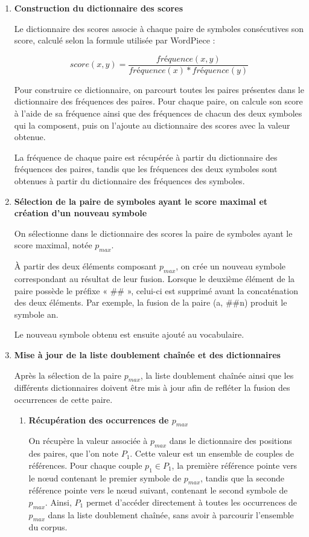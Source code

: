 \documentclass[12pt,a4paper]{report}
\begin{document}
\begin{enumerate}
		\item \textbf{Construction du dictionnaire des scores}
		
		Le dictionnaire des scores associe à chaque paire de symboles consécutives son score, calculé selon la formule utilisée par WordPiece :
		
		\[
		score(x,y)=\frac{fréquence(x,y)}{fréquence(x) * fréquence(y)}
		\]
		
		Pour construire ce dictionnaire, on parcourt toutes les paires présentes dans le dictionnaire des fréquences des paires. Pour chaque paire, on calcule son score à l'aide de sa fréquence ainsi que des fréquences de chacun des deux symboles qui la composent, puis on l'ajoute au dictionnaire des scores avec la valeur obtenue.
		
		La fréquence de chaque paire est récupérée à partir du dictionnaire des fréquences des paires, tandis que les fréquences des deux symboles sont obtenues à partir du dictionnaire des fréquences des symboles.
		
		\item \textbf{Sélection de la paire de symboles ayant le score maximal et création d’un nouveau symbole}
		
		On sélectionne dans le dictionnaire des scores la paire de symboles ayant le score maximal, notée $p_{max}$.
		
		À partir des deux éléments composant $p_{max}$, on crée un nouveau symbole correspondant au résultat de leur fusion. Lorsque le deuxième élément de la paire possède le préfixe « \#\# », celui-ci est supprimé avant la concaténation des deux éléments. Par exemple, la fusion de la paire (a, \#\#n) produit le symbole an.
		
		Le nouveau symbole obtenu est ensuite ajouté au vocabulaire.
		
		\item \textbf{Mise à jour de la liste doublement chaînée et des dictionnaires}
		
		Après la sélection de la paire $p_{max}$, la liste doublement chaînée ainsi que les différents dictionnaires doivent être mis à jour afin de refléter la fusion des occurrences de cette paire.
		
		\begin{enumerate}[label=\alph*)]
			\item \textbf{Récupération des occurrences de $p_{max}$}
			
			On récupère la valeur associée à $p_{max}$ dans le dictionnaire des positions des paires, que l'on note $P_1$. Cette valeur est un ensemble de couples de références. Pour chaque couple $p_1 \in P_1$, la première référence pointe vers le nœud contenant le premier symbole de $p_{max}$, tandis que la seconde référence pointe vers le nœud suivant, contenant le second symbole de $p_{max}$. Ainsi, $P_1$ permet d'accéder directement à toutes les occurrences de $p_{max}$ dans la liste doublement chaînée, sans avoir à parcourir l'ensemble du corpus.
			

\end{enumerate}
\end{enumerate}
\end{document}
